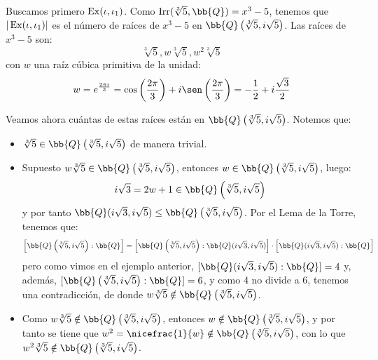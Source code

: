 \begin{ejercicio}
    Buscamos primero $\operatorname{Ex}(\iota, \iota_1)$. Como $\Irr(\sqrt[3]{5},\bb{Q}) = x^3-5$, tenemos que $|\operatorname{Ex}(\iota, \iota_1)|$ es el número de raíces de $x^3-5$ en $\bb{Q}\left(\sqrt[3]{5},i\sqrt{5}\right)$. Las raíces de $x^3-5$ son:
    \begin{equation*}
        \sqrt[3]{5}, w\sqrt[3]{5}, w^2\sqrt[3]{5}
    \end{equation*}
    con $w$ una raíz cúbica primitiva de la unidad:
    \begin{equation*}
        w = e^{\frac{2\pi i}{3}} = \cos\left(\frac{2\pi}{3}\right) + i\sen\left(\frac{2\pi}{3}\right) = -\frac{1}{2} + i\frac{\sqrt{3}}{2}
    \end{equation*}

    Veamos ahora cuántas de estas raíces están en $\bb{Q}\left(\sqrt[3]{5},i\sqrt{5}\right)$. Notemos que:
    \begin{itemize}
        \item $\sqrt[3]{5}\in \bb{Q}\left(\sqrt[3]{5},i\sqrt{5}\right)$ de manera trivial.
        \item Supuesto $w\sqrt[3]{5}\in \bb{Q}\left(\sqrt[3]{5},i\sqrt{5}\right)$, entonces $w\in \bb{Q}\left(\sqrt[3]{5},i\sqrt{5}\right)$, luego:
        \begin{equation*}
            i\sqrt{3} = 2w+1 \in \bb{Q}\left(\sqrt[3]{5},i\sqrt{5}\right)
        \end{equation*}
        y por tanto $\bb{Q}(i\sqrt{3},i\sqrt{5})\leq \bb{Q}\left(\sqrt[3]{5},i\sqrt{5}\right)$. Por el Lema de la Torre, tenemos que:
        \begin{equation*}
            \left[\bb{Q}\left(\sqrt[3]{5},i\sqrt{5}\right):\bb{Q}\right] = \left[\bb{Q}\left(\sqrt[3]{5},i\sqrt{5}\right):\bb{Q}(i\sqrt{3},i\sqrt{5})\right]\cdot \left[\bb{Q}(i\sqrt{3},i\sqrt{5}):\bb{Q}\right]
        \end{equation*}
        pero como vimos en el ejemplo anterior, $[\bb{Q}(i\sqrt{3},i\sqrt{5}):\bb{Q}] = 4$ y, además, $[\bb{Q}\left(\sqrt[3]{5},i\sqrt{5}\right):\bb{Q}] = 6$, y como $4$ no divide a $6$, tenemos una contradicción, de donde $w\sqrt[3]{5}\notin \bb{Q}\left(\sqrt[3]{5},i\sqrt{5}\right)$.
        \item Como $w\sqrt[3]{5}\notin \bb{Q}\left(\sqrt[3]{5},i\sqrt{5}\right)$, entonces $w\notin \bb{Q}\left(\sqrt[3]{5},i\sqrt{5}\right)$, y por tanto se tiene que $w^2=\nicefrac{1}{w}\notin \bb{Q}\left(\sqrt[3]{5},i\sqrt{5}\right)$, con lo que $w^2\sqrt[3]{5}\notin \bb{Q}\left(\sqrt[3]{5},i\sqrt{5}\right)$.
    \end{itemize}


\end{ejercicio}
